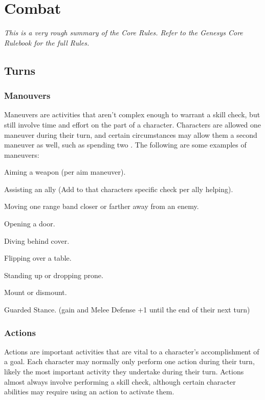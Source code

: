 \chapter{Combat}\label{chap:combat}

\begin{centering}
    \textit{This is a very rough summary of the Core Rules. Refer to the Genesys Core Rulebook for the full Rules.}
\end{centering}

\begin{multicols}{2}

\section{Turns}
\subsection{Manouvers}
Maneuvers are activities that aren’t complex enough to
warrant a skill check, but still involve time and effort
on the part of a character. Characters are allowed one
maneuver during their turn, and certain circumstances
may allow them a second maneuver as well, such as spending two \advantage.
The following are some examples of maneuvers:
\begin{description}
    \item Aiming a weapon (\boost per aim maneuver).
    \item Assisting an ally (Add \boost to that characters specific check per ally helping).
    \item Moving one range band closer or farther away from an enemy.
    \item Opening a door.
    \item Diving behind cover.
    \item Flipping over a table.
    \item Standing up or dropping prone.
    \item Mount or dismount.
    \item Guarded Stance. (gain \setback and Melee Defense +1 until the end of their next turn)
\end{description}

\subsection{Actions}
Actions are important activities that are vital to a character's accomplishment
of a goal. Each character may normally only perform one action during their
turn, likely the most important activity they undertake during their turn.
Actions almost always involve performing a skill check, although certain
character abilities may require using an action to activate them.


\end{multicols}
